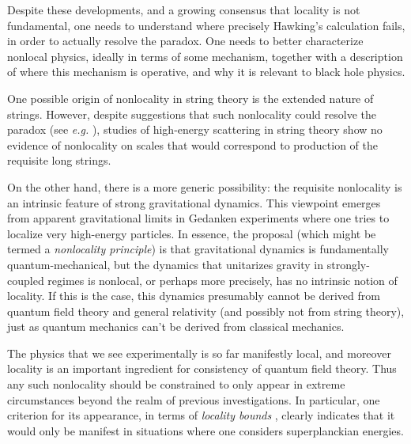 Despite these developments, and a growing consensus that locality is not fundamental, one needs  to understand   where precisely Hawking's calculation fails, in order to actually resolve the paradox.  One needs to better characterize nonlocal physics, ideally in terms of some mechanism, together with a description of where this mechanism is operative, and why it is relevant to black hole physics.

One possible origin of nonlocality in string theory is the extended nature of strings.  However, despite suggestions that such nonlocality could resolve the paradox (see {\it e.g.} \LPSTU), studies of high-energy scattering in string theory show no evidence of nonlocality on scales that would correspond to production of the requisite long strings\SGloc.

On the other hand, there is a more generic possibility:  the requisite nonlocality is an intrinsic feature of strong gravitational dynamics.  This viewpoint  emerges from apparent gravitational limits in Gedanken experiments where one tries to localize very high-energy particles.  In essence, the  proposal (which might be termed a {\it nonlocality principle}) is that gravitational dynamics is fundamentally quantum-mechanical, but the dynamics that unitarizes gravity in strongly-coupled regimes is nonlocal, or perhaps more precisely, has no intrinsic notion of locality.  If this is the case, this dynamics presumably cannot be derived from quantum field theory and general relativity (and possibly not from string theory), just as quantum mechanics can't be derived from classical mechanics.

The physics that we see experimentally is so far manifestly local, and moreover locality is an important ingredient for consistency of quantum field theory.  Thus any such nonlocality should be constrained to only appear in extreme circumstances beyond the realm of previous investigations.  In particular, one criterion for its appearance, in terms of {\it locality bounds} , clearly indicates that it would only be manifest in situations where one considers superplanckian energies.

